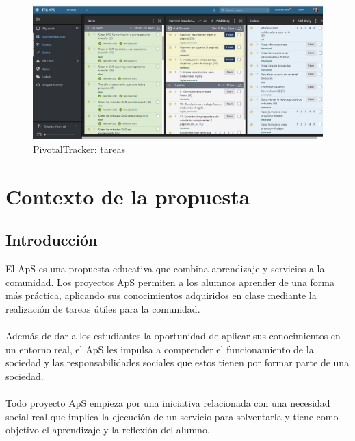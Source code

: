 \documentclass[11pt]{book}
\begin{document}
\begin{figure}[t]
	\centering
	\includegraphics[scale=0.4]{pivotal2}
	\caption{PivotalTracker: tareas}
	\label{fig:pivotal2}
\end{figure}
\chapter{Contexto de la propuesta}\label{cap:contexto}
\section{Introducción}
El ApS es una propuesta educativa que combina aprendizaje y servicios a la comunidad. Los proyectos  ApS permiten a los alumnos aprender de una forma más práctica, aplicando sus conocimientos adquiridos en clase mediante la realización de tareas útiles para la comunidad. \\\\
Además de dar a los estudiantes la oportunidad de aplicar sus conocimientos en un entorno real, el ApS les impulsa a comprender el funcionamiento de la sociedad y las responsabilidades sociales que estos tienen por formar parte de una sociedad.\\\\
Todo proyecto ApS empieza por una iniciativa relacionada con una necesidad social real que implica la ejecución de un servicio para solventarla y tiene como objetivo el aprendizaje y la reflexión del alumno.
\end{document}
